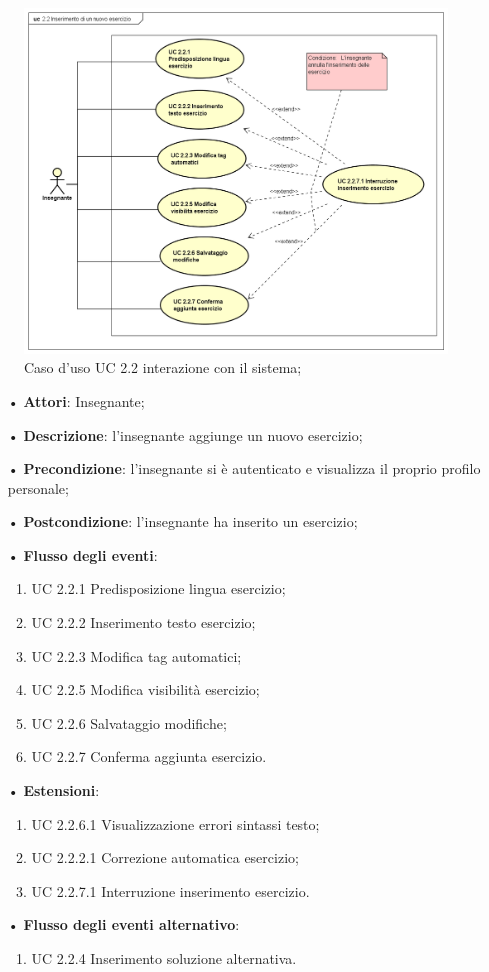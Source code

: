 \begin{figure}[H]
	\centering
	\includegraphics[width=17cm]{img/UC22SISTEMA.png} 
	\caption{Caso d'uso UC 2.2 interazione con il sistema;}
\end{figure}

\begin{itemize}
	\item[•] \textbf{Attori}: Insegnante;
	\item[•] \textbf{Descrizione}: l'insegnante aggiunge un nuovo esercizio;
	\item[•] \textbf{Precondizione}: l'insegnante si è autenticato e visualizza il proprio profilo personale;
	\item[•] \textbf{Postcondizione}: l'insegnante ha inserito un esercizio;
	\item[•] \textbf{Flusso degli eventi}:
	\begin{enumerate}
		\item UC 2.2.1 Predisposizione lingua esercizio;
		\item UC 2.2.2 Inserimento testo esercizio;
		\item UC 2.2.3 Modifica tag automatici;

		\item UC 2.2.5 Modifica visibilità esercizio;
		\item UC 2.2.6 Salvataggio modifiche;
		\item UC 2.2.7 Conferma aggiunta esercizio.
	\end{enumerate}
	\item[•] \textbf{Estensioni}:	
	\begin{enumerate}
		\item UC 2.2.6.1 Visualizzazione errori sintassi testo;
		\item UC 2.2.2.1 Correzione automatica esercizio;
		\item UC 2.2.7.1 Interruzione inserimento esercizio.
	\end{enumerate}
	\item[•] \textbf{Flusso degli eventi alternativo}:
	\begin{enumerate}
		\item UC 2.2.4 Inserimento soluzione alternativa.
	\end{enumerate}
\end{itemize}
